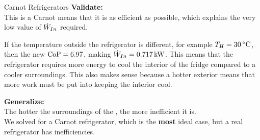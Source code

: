 \begin{example}{Carnot Refrigerators}
  \textbf{Validate:} \\
  This is a Carnot  means that it is as efficient as possible, which explains the very low value of $\dot{W}_{In}$ required.

  If the temperature outside the refrigerator is different, for example $\Temp_{H} = \SI{30}{\degreeCelsius}$, then the new $\text{CoP} = 6.97$, making $\dot{W}_{In} = \SI{0.717}{\kilo\watt}$.
  This means that the refrigerator requires more energy to cool the interior of the fridge compared to a cooler surroundings.
  This also makes sense because a hotter exterior means that more work must be put into keeping the interior cool.

  \textbf{Generalize:} \\
  The hotter the surroundings of the , the more inefficient it is. \\
  We solved for a Carnot refrigerator, which is the \textbf{most} ideal case, but a real refrigerator has inefficiencies.
\end{example}

